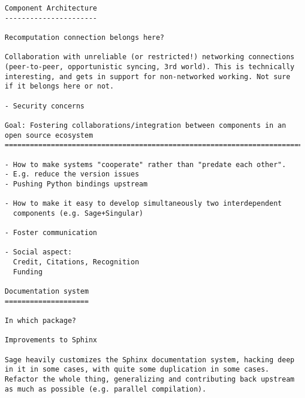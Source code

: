 \begin{Workpackage}{\thewpno}
\begin{verbatim}
Component Architecture
----------------------

Recomputation connection belongs here?

Collaboration with unreliable (or restricted!) networking connections
(peer-to-peer, opportunistic syncing, 3rd world). This is technically
interesting, and gets in support for non-networked working. Not sure
if it belongs here or not.

- Security concerns

Goal: Fostering collaborations/integration between components in an open source ecosystem
=============================================================================

- How to make systems "cooperate" rather than "predate each other".
- E.g. reduce the version issues
- Pushing Python bindings upstream

- How to make it easy to develop simultaneously two interdependent
  components (e.g. Sage+Singular)

- Foster communication

- Social aspect:
  Credit, Citations, Recognition
  Funding

Documentation system
====================

In which package?

Improvements to Sphinx

Sage heavily customizes the Sphinx documentation system, hacking deep
in it in some cases, with quite some duplication in some cases.
Refactor the whole thing, generalizing and contributing back upstream
as much as possible (e.g. parallel compilation).
\end{verbatim}

\end{Workpackage}
